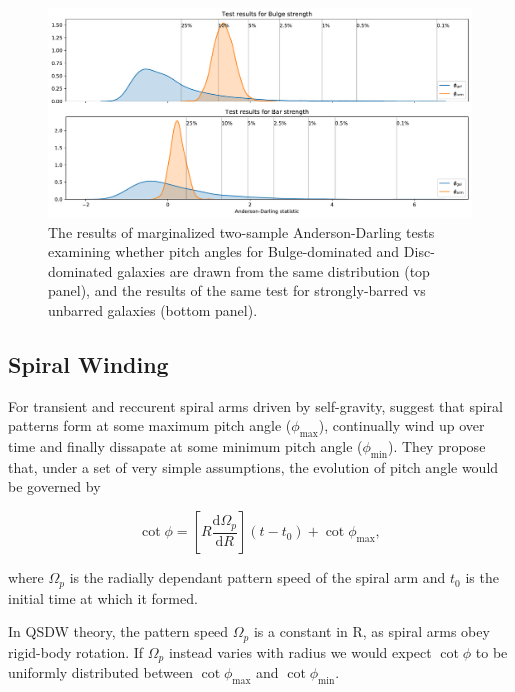\begin{figure}
  \includegraphics[width=17.7cm]{plots/bulge_bar_test_results.pdf}
  \caption{The results of marginalized two-sample Anderson-Darling tests examining whether pitch angles for Bulge-dominated and Disc-dominated galaxies are drawn from the same distribution (top panel), and the results of the same test for strongly-barred vs unbarred galaxies (bottom panel).}
  \label{fig:ad-morphology-test}
\end{figure}


\subsection{Spiral Winding}
\label{section:spiral_winding}

For transient and reccurent spiral arms driven by self-gravity, \citet{2019arXiv190910291P} suggest that spiral patterns form at some maximum pitch angle ($\phi_\mathrm{max}$), continually wind up over time and finally dissapate at some minimum pitch angle ($\phi_\mathrm{min}$). They propose that, under a set of very simple assumptions, the evolution of pitch angle would be governed by

\begin{equation}
  \label{eq:winding}
  \cot{\phi} = \left[R\frac{\mathrm{d}\Omega_p}{\mathrm{d}R}\right](t - t_0) + \cot{\phi_\mathrm{max}},
\end{equation}

where $\Omega_p$ is the radially dependant pattern speed of the spiral arm and $t_0$ is the initial time at which it formed.

In QSDW theory, the pattern speed $\Omega_p$ is a constant in R, as spiral arms obey rigid-body rotation. If $\Omega_p$ instead varies with radius we would expect $\cot{\phi}$ to be uniformly distributed between $\cot{\phi_\mathrm{max}}$ and $\cot{\phi_\mathrm{min}}$.

